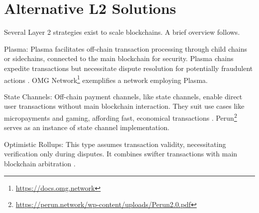 \section{Alternative L2 Solutions}
Several Layer 2 strategies exist to scale blockchains. A brief overview follows.

Plasma: Plasma facilitates off-chain transaction processing through child chains or sidechains, connected to the main blockchain for security. Plasma chains expedite transactions but necessitate dispute resolution for potentially fraudulent actions \cite{thibault_blockchain_2022}. OMG Network\footnote{\url{https://docs.omg.network}} exemplifies a network employing Plasma.

State Channels: Off-chain payment channels, like state channels, enable direct user transactions without main blockchain interaction. They suit use cases like micropayments and gaming, affording fast, economical transactions \cite{negka_blockchain_2021}. Perun\footnote{\url{https://perun.network/wp-content/uploads/Perun2.0.pdf}} serves as an instance of state channel implementation.

Optimistic Rollups: This type assumes transaction validity, necessitating verification only during disputes. It combines swifter transactions with main blockchain arbitration \cite{thibault_blockchain_2022}.
